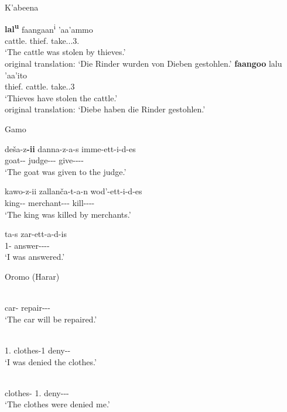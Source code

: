 \enlargethispage{2\baselineskip}
\begin{exe}\ex\label{KabPass2} {K'abeena} \citep[275]{Crass:2005}\nopagebreak[4]
\begin{xlist}
\ex\gll \textbf{lal\textsuperscript{u}} faangaan\textsuperscript{i} 'aa'ammo\\
cattle.\nom{} thief.\loc{} take.\pass{}.\pfv{}.3\sg{}.\mas{}\\
`The cattle was stolen by thieves.'\\
original translation: `Die Rinder wurden von Dieben gestohlen.'
\ex\gll \textbf{faangoo} lalu 'aa'ito\\
thief.\nom{} cattle.\acc{} take.\pfv{}.3\pl{}\\
`Thieves have stolen the cattle.'\\
original translation: `Diebe haben die Rinder gestohlen.'
\end{xlist}
\end{exe}

\begin{exe}\ex\label{GamPass} {Gamo} \citep[378, 394]{Hompo:1990}\nopagebreak[4] 
\begin{xlist}
\ex\gll de\v sa-z\textbf{-ii} danna-z-a-s imme-ett-i-d-es\\
goat--\nom{} judge--\gen{}-\Recip{} give-\pass{}-\persm-\tns{}-\complx{}\\
`The goat was given to the judge.' 

\ex\gll kawo-z-ii zall\textglotstop an\v ca-t-a-n wod'-ett-i-d-es\\
king--\nom{} merchant-\pl{}-\acc{}-\loc{} kill-\pass{}-\persm-\tns{}-\complx{} \\
`The king was killed by merchants.' %

\ex \gll ta-s zar-ett-a-d-is\\
1\sg{}-\Recip{} answer-\pass{}-\persm-\tns{}-\complx{}\\
`I was answered.'
\end{xlist}
\end{exe}

\begin{exe}\ex\label{HarPass} {Oromo (Harar)} \citep[172, 173]{Owens:1985}\nopagebreak[4]
\begin{xlist}
\ex\gll{}  \\
car-\nom{} \foc{} repair-\pass{}-\fem{}-\ipfv{}\\
`The car will be repaired.'  

\ex\gll{}  \\
1\sg{}.\nom{} clothes-1\sg{} deny-\pass{}-\pst{}\\
`I was denied the clothes.'

\ex\gll{}  \\
clothes-\nom{} 1\sg{}.\acc{} deny-\pass{}-\fem{}-\pst{}\\
`The clothes were denied me.' 
\end{xlist} 
\end{exe}

